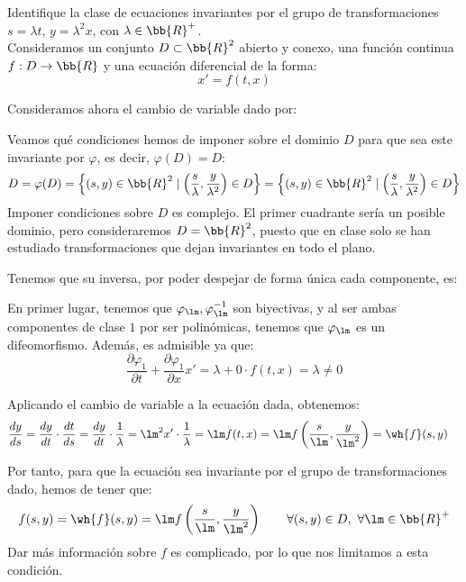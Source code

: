 \begin{ejercicio}
    Identifique la clase de ecuaciones invariantes por el grupo de transformaciones $s = \lambda t$, $y = \lambda^2 x$, con $\lambda\in \bb{R}^+$.\\

    Consideramos un conjunto $D\subset \bb{R}^2$ abierto y conexo, una función continua $f:D\to \bb{R}$ y una ecuación diferencial de la forma:
    \begin{equation*}
        x' = f(t, x)
    \end{equation*}

    Consideramos ahora el cambio de variable dado por:

    Veamos qué condiciones hemos de imponer sobre el dominio $D$ para que sea este invariante por $\varphi$, es decir, $\varphi(D)=D$:
    \begin{equation*}
        D=\varphi(D) = \left\{(s,y)\in \bb{R}^2 \mid \left(\dfrac{s}{\lambda}, \dfrac{y}{\lambda^2}\right)\in D\right\} = \left\{(s,y)\in \bb{R}^2 \mid \left(\dfrac{s}{\lambda}, \dfrac{y}{\lambda^2}\right)\in D\right\}
    \end{equation*}
    Imponer condiciones sobre $D$ es complejo. El primer cuadrante sería un posible dominio, pero consideraremos $D=\bb{R}^2$, puesto que en clase solo se han estudiado transformaciones que dejan invariantes en todo el plano.

    Tenemos que su inversa, por poder despejar de forma única cada componente, es:

    En primer lugar, tenemos que $\varphi_\lm,\varphi_\lm^{-1}$ son biyectivas, y al ser ambas componentes de clase $1$ por ser polinómicas, tenemos que $\varphi_\lm$ es un difeomorfismo. Además, es admisible ya que:
    \begin{equation*}
        \dfrac{\partial \varphi_1}{\partial t} + \dfrac{\partial \varphi_1}{\partial x}x' = \lambda + 0\cdot f(t,x) = \lambda\neq 0
    \end{equation*}

    Aplicando el cambio de variable a la ecuación dada, obtenemos:
    \begin{align*}
        \dfrac{dy}{ds} &= \dfrac{dy}{dt}\cdot \dfrac{dt}{ds} = \dfrac{dy}{dt}\cdot \dfrac{1}{\lambda} = \lm^2x'\cdot \dfrac{1}{\lambda} = \lm f(t,x) = \lm f\left(\dfrac{s}{\lm}, \dfrac{y}{\lm^2}\right) = \wh{f}(s,y)
    \end{align*}

    Por tanto, para que la ecuación sea invariante por el grupo de transformaciones dado, hemos de tener que:
    \begin{equation*}
        f(s,y) = \wh{f}(s,y) = \lm f\left(\dfrac{s}{\lm}, \dfrac{y}{\lm^2}\right) \qquad \forall(s,y)\in D,~\forall \lm\in \bb{R}^+
    \end{equation*}
    Dar más información sobre $f$ es complicado, por lo que nos limitamos a esta condición.
\end{ejercicio}

